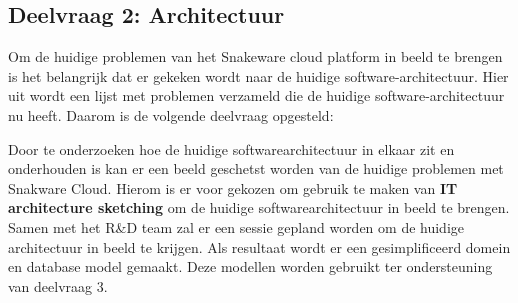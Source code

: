 \subsection{Deelvraag 2: Architectuur}
Om de huidige problemen van het Snakeware cloud platform in beeld te brengen is het belangrijk dat er gekeken wordt naar de huidige software-architectuur.
Hier uit wordt een lijst met problemen verzameld die de huidige software-architectuur nu heeft.
Daarom is de volgende deelvraag opgesteld:

\begin{center}
	\textit{\SubquestionTwo}
\end{center}

\whitespace[0.2]
Door te onderzoeken hoe de huidige softwarearchitectuur in elkaar zit en onderhouden is kan er een beeld geschetst worden van de huidige problemen met Snakware Cloud.
Hierom is er voor gekozen om gebruik te maken van \textbf{IT architecture sketching} om de huidige softwarearchitectuur in beeld te brengen.
Samen met het R\&D team zal er een sessie gepland worden om de huidige architectuur in beeld te krijgen.
Als resultaat wordt er een gesimplificeerd  domein en database model gemaakt.
Deze modellen worden gebruikt ter ondersteuning van deelvraag 3.
